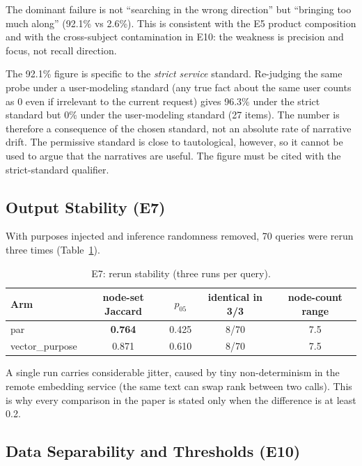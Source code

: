 \documentclass[11pt]{article}
\begin{document}
The dominant failure is not ``searching in the wrong direction'' but ``bringing too much along''
(92.1\% vs 2.6\%). This is consistent with the E5 product composition and with the cross-subject
contamination in E10: the weakness is precision and focus, not recall direction.

The 92.1\% figure is specific to the \emph{strict service} standard. Re-judging the same probe
under a user-modeling standard (any true fact about the same user counts as 0 even if irrelevant
to the current request) gives 96.3\% under the strict standard but 0\% under the user-modeling
standard (27 items). The number is therefore a consequence of the chosen standard, not an absolute
rate of narrative drift. The permissive standard is close to tautological, however, so it cannot
be used to argue that the narratives are useful. The figure must be cited with the strict-standard
qualifier.

\subsection{Output Stability (E7)}
\label{sec:stability}

With purposes injected and inference randomness removed, 70 queries were rerun three times
(Table~\ref{tab:e7}).

\begin{table}[t]
  \centering
  \small
  \begin{tabular}{@{}lcccc@{}}
    \toprule
    Arm & node-set Jaccard & $p_{05}$ & identical in 3/3 & node-count range \\
    \midrule
    par & \textbf{0.764} & 0.425 & 8/70 & 7.5 \\
    vector\_purpose & 0.871 & 0.610 & 8/70 & 7.5 \\
    \bottomrule
  \end{tabular}
  \caption{E7: rerun stability (three runs per query).}\label{tab:e7}
\end{table}

A single run carries considerable jitter, caused by tiny non-determinism in the remote embedding
service (the same text can swap rank between two calls). This is why every comparison in the
paper is stated only when the difference is at least 0.2.

\subsection{Data Separability and Thresholds (E10)}
\label{sec:e10}
\end{document}
